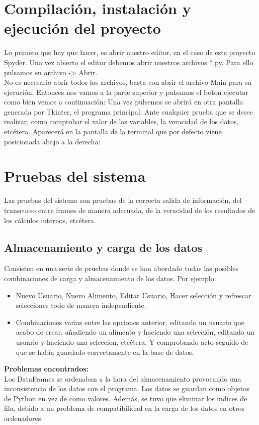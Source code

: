 \section{Compilación, instalación y ejecución del proyecto}
Lo primero que hay que hacer, es abrir nuestro editor, en el caso de este proyecto Spyder. Una vez abierto el editor debemos abrir nuestros archivos *.py. Para ello pulsamos en archivo -> Abrir.\\
No es necesario abrir todos los archivos, basta con abrir el archivo Main para su ejecución. Entonces nos vamos a la parte superior y pulsamos el boton ejecutar como bien vemos a continuación:
Una vez pulsemos se abrirá en otra pantalla generada por Tkinter, el programa principal:
Ante cualquier prueba que se desee realizar, como comprobar el valor de las variables, la veracidad de los datos, etcétera. Aparecerá en la pantalla de la terminal que por defecto viene posicionada abajo a la derecha:
\section{Pruebas del sistema}
Las pruebas del sistema son pruebas de la correcta salida de información, del transcurso entre frames de manera adecuada, de la veracidad de los resultados de los cálculos internos, etcétera.
\subsection{Almacenamiento y carga de los datos}
Consisten en una serie de pruebas donde se han abordado todas las posibles combinaciones de carga y almacenamiento de los datos. Por ejemplo:
\begin{itemize}
\item Nuevo Usuario, Nuevo Alimento, Editar Usuario, Hacer selección y refrescar selecciones todo de manera independiente.
\item Combinaciones varias entre las opciones anterior, editando un usuario que acabo de crear, añadiendo un alimento y haciendo una selección, editando un usuario y haciendo una seleccion, etcétera. Y comprobando acto seguido de que se había guardado correctamente en la base de datos.
\end{itemize}
\textbf{Problemas encontrados:}\\
Los DataFrames se ordenaban a la hora del almacenamiento provocando una inconsistencia de los datos con el programa. Los datos se guardan como objetos de Python en vez de como valores. Además, se tuvo que eliminar los indices de fila, debido a un problema de compatibilidad en la carga de los datos en otros ordenadores.
